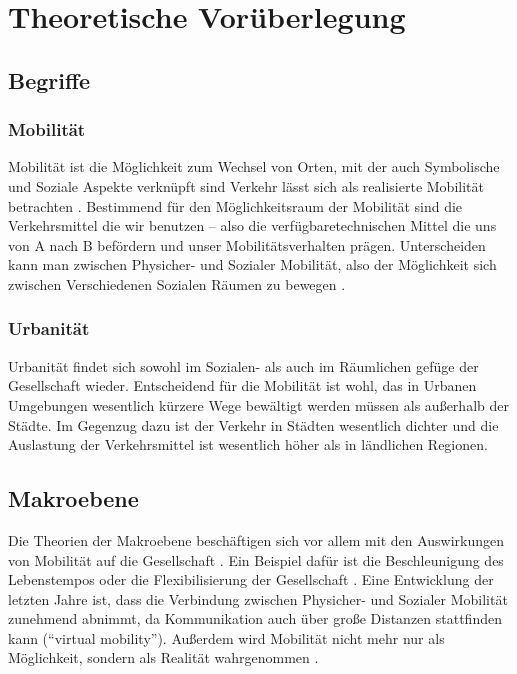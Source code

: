 
\section{Theoretische Vorüberlegung}

\subsection{Begriffe}
\subsubsection*{Mobilität}

Mobilität ist die Möglichkeit zum Wechsel von Orten, mit der auch Symbolische und Soziale Aspekte verknüpft sind Verkehr lässt sich als realisierte Mobilität betrachten \parencite[6]{fh7}.
Bestimmend für den Möglichkeitsraum der Mobilität sind die Verkehrsmittel die wir benutzen – also die verfügbaretechnischen Mittel die uns von A nach B befördern und unser Mobilitätsverhalten prägen.
Unterscheiden kann man zwischen Physicher- und Sozialer Mobilität, also der Möglichkeit sich zwischen Verschiedenen Sozialen Räumen zu bewegen \parencite[67 f.]{schulz}.

\subsubsection*{Urbanität}
Urbanität findet sich sowohl im Sozialen- als auch im Räumlichen gefüge der Gesellschaft wieder.
Entscheidend für die Mobilität ist wohl, das in Urbanen Umgebungen wesentlich kürzere Wege bewältigt werden müssen als außerhalb der Städte.
Im Gegenzug dazu ist der Verkehr in Städten wesentlich dichter und die Auslastung der Verkehrsmittel ist wesentlich höher als in ländlichen Regionen.

\subsection{Makroebene}
Die Theorien der Makroebene beschäftigen sich vor allem mit den Auswirkungen von Mobilität auf die Gesellschaft \parencite[6 ff.]{widmer}.
Ein Beispiel dafür ist die Beschleunigung des Lebenstempos \parencite{rosa,rosa1} oder die Flexibilisierung der Gesellschaft \parencite{sennett}.
Eine Entwicklung der letzten Jahre ist, dass die Verbindung zwischen Physicher- und Sozialer Mobilität zunehmend abnimmt, da Kommunikation auch über große Distanzen stattfinden kann (\enquote{virtual mobility}).
Außerdem wird Mobilität nicht mehr nur als Möglichkeit, sondern als Realität wahrgenommen \parencite[17 f.]{widmer}.

